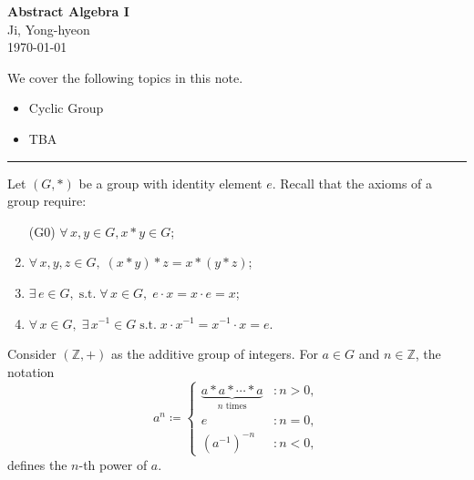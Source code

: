 \documentclass[11pt,openany]{article}
\begin{document}
\begin{center}
	\huge\textbf{Abstract Algebra I}\\
	\vspace{0.5em}
	\large{Ji, Yong-hyeon}\\
	\vspace{0.5em}
	\normalsize{\today}\\
\end{center}

\noindent 
We cover the following topics in this note.
\begin{itemize}
	\item Cyclic Group
	\item TBA
\end{itemize}
\hrule\vspace{12pt}
\newpage


\begin{note}
Let \( (G, \ast) \) be a group with identity element \( e \). Recall that the axioms of a group require:
\begin{enumerate}[(G1)]
	\item[(G0)] $\forall\, x, y \in G,  x \ast y\in G$;
	\item $\forall\, x, y, z \in G,\;  (x \ast y) \ast z = x \ast (y\ast z)$;
	\item $\exists\, e \in G,\; \text{s.t.}\; \forall\, x \in G,\; e \cdot x = x \cdot e = x$;
	\item $\forall\, x \in G,\; \exists\, x^{-1} \in G\; \text{s.t.}\; x \cdot x^{-1} = x^{-1} \cdot x = e$.
\end{enumerate}
Consider \((\mathbb{Z},+)\) as the additive group of integers. For \( a \in G \) and \( n \in \mathbb{Z} \), the notation
\[
a^n \coloneqq
\begin{cases}
	\underbrace{a \ast a \ast \cdots \ast a}_{n \text{ times}} &: n > 0, \\
	e &: n = 0, \\
	(a^{-1})^{-n}&: n < 0,
\end{cases}
\]
defines the \( n \)-th power of \( a \).
\end{note}
\end{document}
